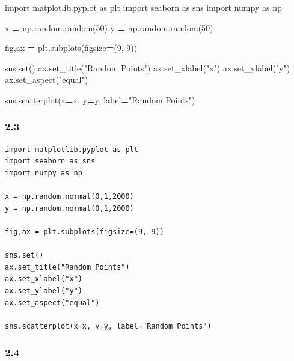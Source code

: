 \documentclass[
  oneside]{book}
\newenvironment{Shaded}{\begin{snugshade}}{\end{snugshade}}
\newcommand{\BuiltInTok}[1]{#1}
\newcommand{\DecValTok}[1]{\textcolor[rgb]{0.00,0.00,0.81}{#1}}
\newcommand{\ImportTok}[1]{#1}
\newcommand{\NormalTok}[1]{#1}
\newcommand{\OperatorTok}[1]{\textcolor[rgb]{0.81,0.36,0.00}{\textbf{#1}}}
\newcommand{\StringTok}[1]{\textcolor[rgb]{0.31,0.60,0.02}{#1}}
\begin{document}
\begin{Shaded}
\begin{Highlighting}[]
\ImportTok{import}\NormalTok{ matplotlib.pyplot }\ImportTok{as}\NormalTok{ plt}
\ImportTok{import}\NormalTok{ seaborn }\ImportTok{as}\NormalTok{ sns}
\ImportTok{import}\NormalTok{ numpy }\ImportTok{as}\NormalTok{ np}

\NormalTok{x }\OperatorTok{=}\NormalTok{ np.random.random(}\DecValTok{50}\NormalTok{)}
\NormalTok{y }\OperatorTok{=}\NormalTok{ np.random.random(}\DecValTok{50}\NormalTok{)}

\NormalTok{fig,ax }\OperatorTok{=}\NormalTok{ plt.subplots(figsize}\OperatorTok{=}\NormalTok{(}\DecValTok{9}\NormalTok{, }\DecValTok{9}\NormalTok{))}

\NormalTok{sns.}\BuiltInTok{set}\NormalTok{()}
\NormalTok{ax.set\_title(}\StringTok{"Random Points"}\NormalTok{) }
\NormalTok{ax.set\_xlabel(}\StringTok{"x"}\NormalTok{)}
\NormalTok{ax.set\_ylabel(}\StringTok{"y"}\NormalTok{)}
\NormalTok{ax.set\_aspect(}\StringTok{"equal"}\NormalTok{)}

\NormalTok{sns.scatterplot(x}\OperatorTok{=}\NormalTok{x, y}\OperatorTok{=}\NormalTok{y, label}\OperatorTok{=}\StringTok{"Random Points"}\NormalTok{)}
\end{Highlighting}
\end{Shaded}

\hypertarget{section-1}{%
\subsubsection{2.3}\label{section-1}}

\begin{verbatim}
import matplotlib.pyplot as plt
import seaborn as sns
import numpy as np

x = np.random.normal(0,1,2000)
y = np.random.normal(0,1,2000)

fig,ax = plt.subplots(figsize=(9, 9))

sns.set()
ax.set_title("Random Points") 
ax.set_xlabel("x")
ax.set_ylabel("y")
ax.set_aspect("equal")

sns.scatterplot(x=x, y=y, label="Random Points")
\end{verbatim}

\hypertarget{section-2}{%
\subsubsection{2.4}\label{section-2}}
\end{document}
